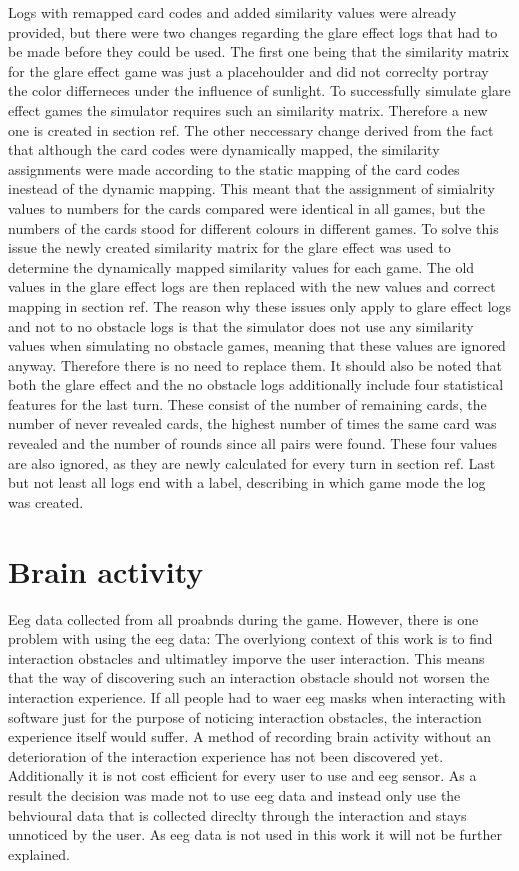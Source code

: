 Logs with remapped card codes and added similarity values were already provided, but there were two changes regarding the glare effect logs that had to be made before they could be used. The first one being that the similarity matrix for the glare effect game was just a placehoulder and did not correclty portray the color differneces under the influence of sunlight. To successfully simulate glare effect games the simulator requires such an similarity matrix. Therefore a new one is created in section ref. The other neccessary change derived from the fact that although the card codes were dynamically mapped, the similarity assignments were made according to the static mapping of the card codes inestead of the dynamic mapping. This meant that the assignment of simialrity values to numbers for the cards compared were identical in all games, but the numbers of the cards stood for different colours in different games. To solve this issue the newly created similarity matrix for the glare effect was used to determine the dynamically mapped similarity values for each game. The old values in the glare effect logs are then replaced with the new values and correct mapping in section ref. The reason why these issues only apply to glare effect logs and not to no obstacle logs is that the simulator does not use any similarity values when simulating no obstacle games, meaning that these values are ignored anyway. Therefore there is no need to replace them. It should also be noted that both the glare effect and the no obstacle logs additionally include four statistical features for the last turn. These consist of the number of remaining cards, the number of never revealed cards, the highest number of times the same card was revealed and the number of rounds since all pairs were found. These four values are also ignored, as they are newly calculated for every turn in section ref. Last but not least all logs end with a label, describing in which game mode the log was created. 

\section{Brain activity}
\label{brain_activity}
Eeg data collected from all proabnds during the game. However, there is one problem with using the eeg data: The overlyiong context of this work is to find interaction obstacles and ultimatley imporve the user interaction. This means that the way of discovering such an interaction obstacle should not worsen the interaction experience. If all people had to waer eeg masks when interacting with software just for the purpose of noticing interaction obstacles, the interaction experience itself would suffer. A method of recording brain activity without an deterioration of the interaction experience has not been discovered yet. Additionally it is not cost efficient for every user to use and eeg sensor. As a result the decision was made not to use eeg data and instead only use the behvioural data that is collected direclty through the interaction and stays unnoticed by the user. As eeg data is not used in this work it will not be further explained. 




